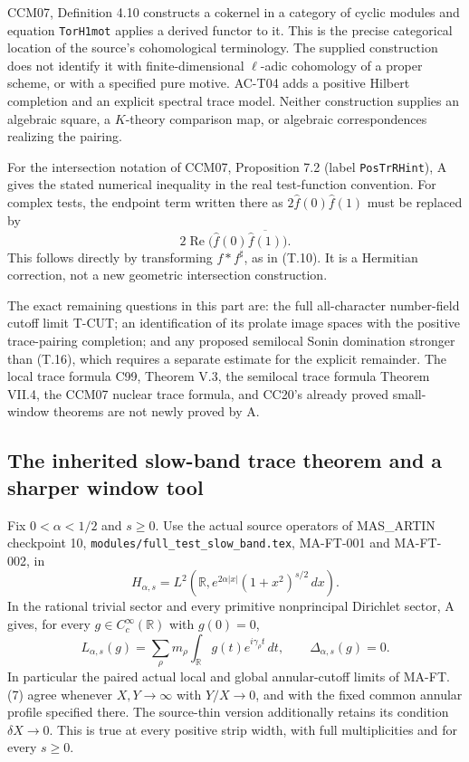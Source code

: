 CCM07, Definition 4.10 constructs a cokernel
in a category of cyclic modules and
equation \texttt{TorH1mot} applies a derived
functor to it. This is the precise
categorical location of the source's
cohomological terminology. The supplied
construction does not identify it with
finite-dimensional \(\ell\)-adic
cohomology of a proper scheme, or with
a specified pure motive. AC-T04 adds
a positive Hilbert completion and an
explicit spectral trace model. Neither
construction supplies an algebraic
square, a \(K\)-theory comparison map,
or algebraic correspondences realizing
the pairing.

For the intersection notation of CCM07,
Proposition 7.2 (label \texttt{PosTrRHint}),
A gives the stated numerical inequality
in the real test-function convention.
For complex tests, the endpoint term
written there as \(2\widehat f(0)
\widehat f(1)\) must be replaced by
\[
 2\operatorname{Re}
      \bigl(\widehat f(0)\overline{\widehat f(1)}\bigr).
\]
This follows directly by transforming
\(f*f^\sharp\), as in (T.10).
It is a Hermitian correction, not a
new geometric intersection construction.

The exact remaining questions in this
part are: the full all-character
number-field cutoff limit T-CUT; an
identification of its prolate image
spaces with the positive trace-pairing
completion; and any proposed semilocal
Sonin domination stronger than (T.16),
which requires a separate estimate for
the explicit remainder. The local
trace formula C99, Theorem V.3, the
semilocal trace formula Theorem VII.4,
the CCM07 nuclear trace formula, and
CC20's already proved small-window
theorems are not newly proved by A.

\subsection{The inherited slow-band trace theorem and a sharper window tool}

\begin{theorem}
\label{AC-T12}
Fix \(0<\alpha<1/2\) and \(s\geq0\). Use the
actual source operators of MAS\_ARTIN checkpoint 10,
\texttt{modules/full\_test\_slow\_band.tex},
MA-FT-001 and MA-FT-002, in
\[
 H_{\alpha,s}
 =L^2\!\left(\mathbb R,
         e^{2\alpha|x|}(1+x^2)^{s/2}\,dx\right).
\]
In the rational trivial sector and every primitive
nonprincipal Dirichlet sector, A gives, for every
\(g\in C_c^\infty(\mathbb R)\) with \(g(0)=0\),
\[
 L_{\alpha,s}(g)=\sum_\rho m_\rho
        \int_{\mathbb R}g(t)e^{i\gamma_\rho t}\,dt,
 \qquad \Delta_{\alpha,s}(g)=0.                               \tag{T.27}
\]
In particular the paired actual local and global
annular-cutoff limits of MA-FT.(7) agree whenever
\(X,Y\to\infty\) with \(Y/X\to0\), and with the
fixed common annular profile specified there.
The source-thin version additionally retains
its condition \(\delta X\to0\).
This is true at every positive strip width,
with full multiplicities and for every \(s\geq0\).
\end{theorem}

